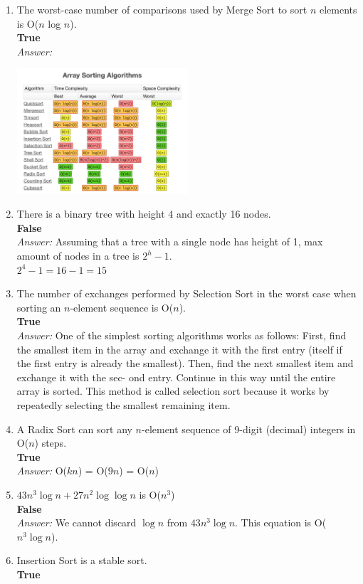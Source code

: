 \documentclass[a4paper]{article}
\newcommand{\ans}{\textit{Answer: }}
\begin{document}
\begin{enumerate}
  \item The worst-case number of comparisons used by Merge Sort to sort $n$ elements is
  O($n$ log $n$). \\
  \textbf{True} \\
  \ans
  \begin{center}
    \includegraphics[width=0.5\textwidth]{fig3.png}
  \end{center}

  \item There is a binary tree with height 4 and exactly 16 nodes. \\ 
  \textbf{False} \\
  \ans Assuming that a tree with a single node has height of 1, max amount of nodes in a tree
  is $2^h-1$. \\
  $2^4-1 = 16 - 1 = 15$

  \item The number of exchanges performed by Selection Sort in the worst case when sorting an $n$-element sequence is O($n$). \\
  \textbf{True} \\
  \ans One of the simplest sorting algorithms works as follows: First, find the smallest item in the array and exchange it with the first entry (itself if the first entry is already the smallest). Then, find the next smallest item and exchange it with the sec- ond entry. Continue in this way until the entire array is sorted. This method is called selection sort because it works by repeatedly selecting the smallest remaining item.

  \item A Radix Sort can sort any $n$-element sequence of 9-digit (decimal) integers in O($n$) steps. \\ 
  \textbf{True} \\
  \ans O($kn$) = O($9n$) = O($n$)

  \item  $43n^3\log n + 27n^2 \log \log n$ is O($n^3$) \\
  \textbf{False} \\
  \ans We cannot discard $\log n$ from $43n^3\log n$. This equation is O($n^3\log n$).

  \item Insertion Sort is a stable sort. \\
  \textbf{True} \\

\end{enumerate}
\end{document}
